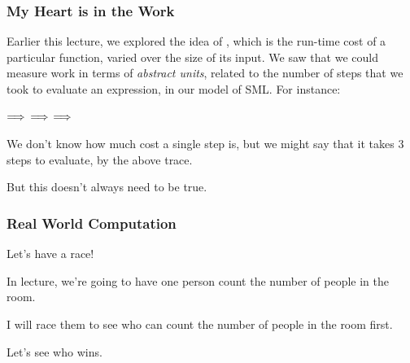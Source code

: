 \documentclass[aspectratio=169]{beamer}
\begin{document}



\begin{frame}[fragile]
  \frametitle{My Heart is in the Work}

  Earlier this lecture, we explored the idea of , which is the run-time cost of a particular function,
  varied over the size of its input. We saw that we could measure work in terms of \textit{abstract units}, related
  to the number of steps that we took to evaluate an expression, in our model of SML. For instance:

  \pause
  \vspace{5pt}

   $\Longrightarrow$  $\Longrightarrow$  $\Longrightarrow$ 

  \pause
  \vspace{\fill}

  We don't know how much cost a single step is, but we might say that it takes 3 steps to evaluate,
  by the above trace.

  \pause
  \vspace{\fill}

  But this doesn't always need to be true.
\end{frame}

\begin{frame}[fragile]
  \frametitle{Real World Computation}

  Let's have a race!

  \pause
  \vspace{\fill}

  In lecture, we're going to have one person count the number of people in the room.

  \pause
  \vspace{\fill}

  I will race them to see who can count the number of people in the room first.

  \pause
  \vspace{\fill}

  Let's see who wins.

\end{frame}
\end{document}
